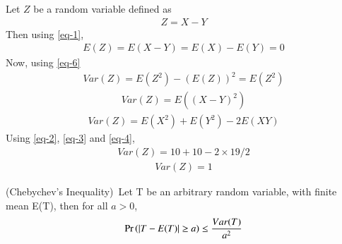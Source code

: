 \documentclass[journal,12pt,twocolumn]{IEEEtran}
\begin{document}
Let $Z$ be a random variable defined as
\begin{align} \label{eq-5}
    Z=X-Y
\end{align}
Then using \eqref{eq-1},
\begin{align} \label{eq-6}
    E(Z)=E(X-Y)=E(X)-E(Y)=0
\end{align}
Now, using \eqref{eq-6}
\begin{align}
    Var(Z)=E(Z^2)-(E(Z))^2=E(Z^2)
\end{align}
\begin{align}
    Var(Z)=E((X-Y)^2)
\end{align}
\begin{align}
    Var(Z)=E(X^2)+E(Y^2)-2E(XY)
\end{align}
Using \eqref{eq-2}, \eqref{eq-3} and \eqref{eq-4},
\begin{align}
    Var(Z)=10+10-2 \times 19/2
\end{align}
\begin{align} \label{eq-7}
    Var(Z)=1
\end{align}

\begin{theorem}
(Chebychev's Inequality)\ Let T be an arbitrary random variable, with finite mean E(T), then for all $a>0$,
\begin{align}
    \Pr\left(|T-E(T)| \geq a\right) \leq \dfrac{Var(T)}{a^2}
\end{align}
\end{theorem}
\end{document}
